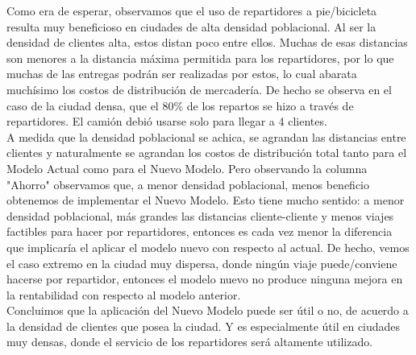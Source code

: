 \documentclass{article}
\begin{document}
    \begin{table}[H]
    \centering
    \caption{Comparación de costos entre metodologías para distintas densidades de clientes por $km^{2}$}
    \end{table}
    
    Como era de esperar, observamos que el uso de repartidores a pie/bicicleta resulta muy beneficioso en ciudades de alta densidad poblacional. Al ser la densidad de clientes alta, estos distan poco entre ellos. Muchas de esas distancias son menores a la distancia máxima permitida para los repartidores, por lo que muchas de las entregas podrán ser realizadas por estos, lo cual abarata muchísimo los costos de distribución de mercadería. De hecho se observa en el caso de la ciudad densa, que el 80\% de los repartos se hizo a través de repartidores. El camión debió usarse solo para llegar a 4 clientes. \\
    A medida que la densidad poblacional se achica, se agrandan las distancias entre clientes y naturalmente se agrandan los costos de distribución total tanto para el Modelo Actual como para el Nuevo Modelo. Pero observando la columna "Ahorro" observamos que, a menor densidad poblacional, menos beneficio obtenemos de implementar el Nuevo Modelo. Esto tiene mucho sentido: a menor densidad poblacional, más grandes las distancias cliente-cliente y menos viajes factibles para hacer por repartidores, entonces es cada vez menor la diferencia que implicaría el aplicar el modelo nuevo con respecto al actual. De hecho, vemos el caso extremo en la ciudad muy dispersa, donde ningún viaje puede/conviene hacerse por repartidor, entonces el modelo nuevo no produce ninguna mejora en la rentabilidad con respecto al modelo anterior. \\
    Concluimos que la aplicación del Nuevo Modelo puede ser útil o no, de acuerdo a la densidad de clientes que posea la ciudad. Y es especialmente útil en ciudades muy densas, donde el servicio de los repartidores será altamente utilizado. 
    
\end{document}
